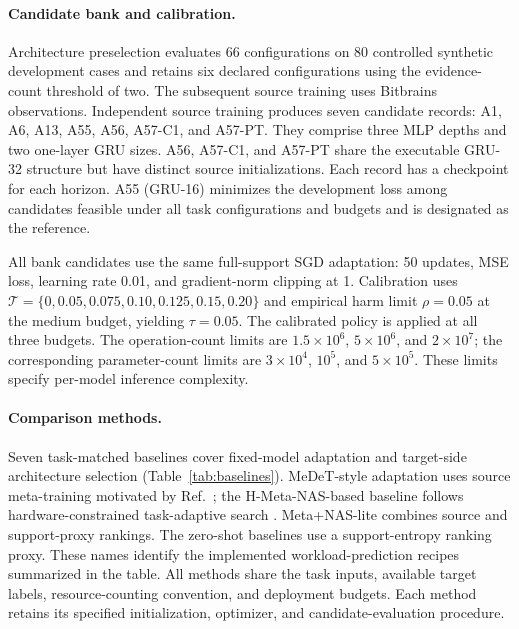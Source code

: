 \documentclass[a4paper,fleqn]{cas-sc}
\begin{document}


\paragraph{Candidate bank and calibration.}
Architecture preselection evaluates 66 configurations on 80 controlled
synthetic development cases and retains six declared configurations using
the evidence-count threshold of two. The subsequent source training uses
Bitbrains observations. Independent source training
produces seven candidate records: A1, A6, A13, A55, A56, A57-C1, and A57-PT.
They comprise three MLP depths and two one-layer GRU sizes. A56, A57-C1,
and A57-PT share the executable GRU-32 structure but have distinct source
initializations. Each record has a checkpoint for each horizon. A55
(GRU-16) minimizes the development loss among candidates feasible under all
task configurations and budgets and is designated as the reference.

All bank candidates use the same full-support SGD adaptation: 50 updates,
MSE loss, learning rate 0.01, and gradient-norm clipping at 1. Calibration
uses $\mathcal T=\{0,0.05,0.075,0.10,0.125,0.15,0.20\}$ and empirical
harm limit $\rho=0.05$ at the medium budget, yielding $\tau=0.05$.
The calibrated policy is applied at all three budgets. The operation-count
limits are $1.5\times10^6$, $5\times10^6$, and $2\times10^7$; the
corresponding parameter-count limits are $3\times10^4$, $10^5$, and
$5\times10^5$. These limits specify per-model inference complexity.

\paragraph{Comparison methods.}
Seven task-matched baselines cover fixed-model adaptation and target-side
architecture selection (Table~\ref{tab:baselines}). MeDeT-style adaptation
uses source meta-training motivated by Ref.~\cite{ref11}; the
H-Meta-NAS-based baseline follows hardware-constrained task-adaptive search
\cite{ref30}. Meta+NAS-lite combines source and support-proxy rankings.
The zero-shot baselines use a support-entropy ranking proxy. These names
identify the implemented workload-prediction recipes summarized in the table.
All methods share the task inputs, available target labels, resource-counting
convention, and deployment budgets. Each method retains its specified
initialization, optimizer, and candidate-evaluation procedure.


\end{document}
